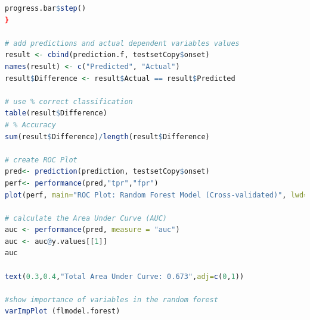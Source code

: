 \documentclass{article}
\begin{document}
\begin{lstlisting}[language=R, caption=k-fold Cross Validation: Random Forest as an example]
  progress.bar$step()
}

# add predictions and actual dependent variables values
result <- cbind(prediction.f, testsetCopy$onset)
names(result) <- c("Predicted", "Actual")
result$Difference <- result$Actual == result$Predicted

# use % correct classification 
table(result$Difference)
# % Accuracy
sum(result$Difference)/length(result$Difference)

# create ROC Plot
pred<- prediction(prediction, testsetCopy$onset)
perf<- performance(pred,"tpr","fpr")
plot(perf, main="ROC Plot: Random Forest Model (Cross-validated)", lwd=3)

# calculate the Area Under Curve (AUC)
auc <- performance(pred, measure = "auc")
auc <- auc@y.values[[1]]
auc

text(0.3,0.4,"Total Area Under Curve: 0.673",adj=c(0,1))

#show importance of variables in the random forest
varImpPlot (flmodel.forest)
\end{lstlisting}
\end{document}
